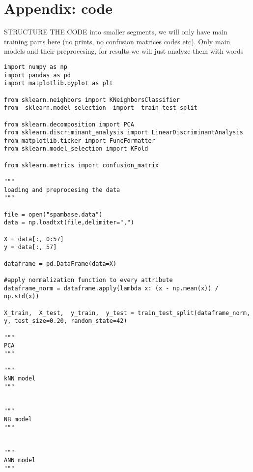 \documentclass[11pt,a4paper]{article}
\begin{document}
\section*{Appendix: code}
STRUCTURE THE CODE into smaller segments, we will only have main training parts here (no prints, no confusion matrices codes etc). Only main models and their preprocesing, for results we will just analyze them with words
\begin{lstlisting}
import numpy as np
import pandas as pd
import matplotlib.pyplot as plt

from sklearn.neighbors import KNeighborsClassifier
from  sklearn.model_selection  import  train_test_split

from sklearn.decomposition import PCA
from sklearn.discriminant_analysis import LinearDiscriminantAnalysis
from matplotlib.ticker import FuncFormatter
from sklearn.model_selection import KFold

from sklearn.metrics import confusion_matrix

"""
loading and preprocesing the data
"""

file = open("spambase.data")
data = np.loadtxt(file,delimiter=",")

X = data[:, 0:57]
y = data[:, 57]

dataframe = pd.DataFrame(data=X)

#apply normalization function to every attribute
dataframe_norm = dataframe.apply(lambda x: (x - np.mean(x)) / np.std(x))

X_train,  X_test,  y_train,  y_test = train_test_split(dataframe_norm,  y, test_size=0.20, random_state=42)

"""
PCA
"""

"""
kNN model
"""


"""
NB model
"""


"""
ANN model
"""

\end{lstlisting}
\end{document}
